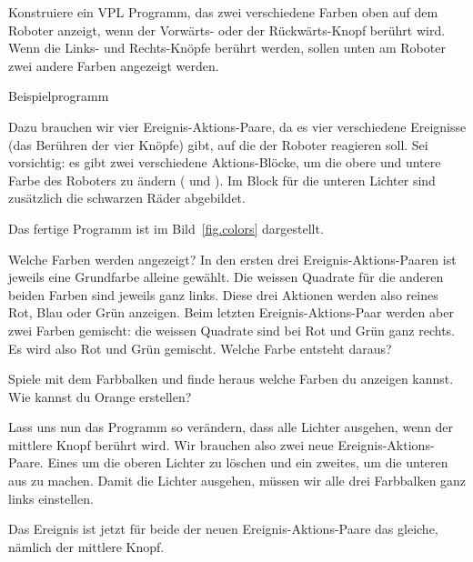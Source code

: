 
Konstruiere ein VPL Programm, das zwei verschiedene Farben oben auf dem Roboter
anzeigt, wenn der Vorwärts- oder der Rückwärts-Knopf berührt wird. Wenn die
Links- und Rechts-Knöpfe berührt werden, sollen unten am Roboter zwei andere
Farben angezeigt werden.

{\raggedleft \hfill Beispielprogramm }

Dazu brauchen wir vier Ereignis-Aktions-Paare, da es vier verschiedene
Ereignisse (das Berühren der vier Knöpfe) gibt, auf die der Roboter reagieren
soll. Sei vorsichtig: es gibt zwei verschiedene Aktions-Blöcke, um die obere
und untere Farbe des Roboters zu ändern ( und
). Im Block für die unteren Lichter sind zusätzlich die
schwarzen Räder abgebildet.

Das fertige Programm ist im Bild~\ref{fig.colors} dargestellt.

Welche Farben werden angezeigt? In den ersten drei Ereignis-Aktions-Paaren ist
jeweils eine Grundfarbe alleine gewählt. Die weissen Quadrate für die anderen
beiden Farben sind jeweils ganz links. Diese drei Aktionen werden also reines
Rot, Blau oder Grün anzeigen. Beim letzten Ereignis-Aktions-Paar werden aber
zwei Farben gemischt: die weissen Quadrate sind bei Rot und Grün ganz rechts.
Es wird also Rot und Grün gemischt. Welche Farbe entsteht daraus?


Spiele mit dem Farbbalken und finde heraus welche Farben du anzeigen kannst.
Wie kannst du Orange erstellen?


Lass uns nun das Programm so verändern, dass alle Lichter ausgehen, wenn der
mittlere Knopf berührt wird. Wir brauchen also zwei neue
Ereignis-Aktions-Paare. Eines um die oberen Lichter zu löschen und ein zweites,
um die unteren aus zu machen. Damit die Lichter ausgehen, müssen wir alle drei
Farbbalken ganz links einstellen.

Das Ereignis ist jetzt für beide der neuen Ereignis-Aktions-Paare das gleiche,
nämlich der mittlere Knopf.



